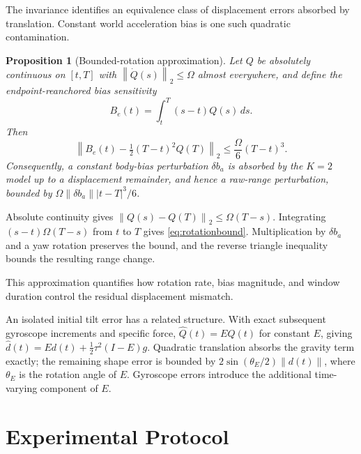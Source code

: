 \documentclass[conference,letterpaper,10pt]{IEEEtran}
\newtheorem{proposition}{Proposition}
\newcommand{\norm}[1]{\left\lVert#1\right\rVert}
\begin{document}
The invariance identifies an equivalence class of displacement errors absorbed by translation. Constant world acceleration bias is one such quadratic contamination.

\begin{proposition}[Bounded-rotation approximation]
Let $Q$ be absolutely continuous on $[t,T]$ with $\norm{\dot Q(s)}_2\le\Omega$ almost everywhere, and define the endpoint-reanchored bias sensitivity
\begin{equation}
 B_e(t)=\int_t^T(s-t)Q(s)\,ds.
\end{equation}
Then
\begin{equation}
 \norm{B_e(t)-\tfrac12(T-t)^2Q(T)}_2
 \le\frac{\Omega}{6}(T-t)^3.
 \label{eq:rotationbound}
\end{equation}
Consequently, a constant body-bias perturbation $\delta b_a$ is absorbed by the $K=2$ model up to a displacement remainder, and hence a raw-range perturbation, bounded by $\Omega\norm{\delta b_a}|t-T|^3/6$.
\end{proposition}
\begin{IEEEproof}
Absolute continuity gives $\norm{Q(s)-Q(T)}_2\le\Omega(T-s)$. Integrating $(s-t)\Omega(T-s)$ from $t$ to $T$ gives \eqref{eq:rotationbound}. Multiplication by $\delta b_a$ and a yaw rotation preserves the bound, and the reverse triangle inequality bounds the resulting range change.
\end{IEEEproof}
This approximation quantifies how rotation rate, bias magnitude, and window duration control the residual displacement mismatch.

An isolated initial tilt error has a related structure. With exact subsequent gyroscope increments and specific force, $\hat Q(t)=E Q(t)$ for constant $E$, giving $\hat d(t)=E d(t)+\tfrac12\tau^2(I-E)g$. Quadratic translation absorbs the gravity term exactly; the remaining shape error is bounded by $2\sin(\theta_E/2)\norm{d(t)}$, where $\theta_E$ is the rotation angle of $E$. Gyroscope errors introduce the additional time-varying component of $E$.

\section{Experimental Protocol}
\end{document}
